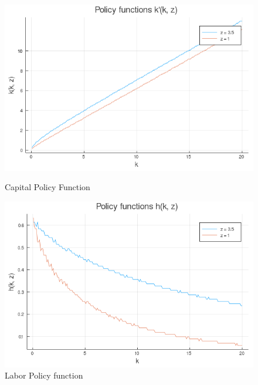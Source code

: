 \documentclass[12pt]{article}
\begin{document}
\begin{figure}[h]
    \centering
    \begin{minipage}{0.45\textwidth}
        \centering
        \includegraphics[width=1.2\textwidth]{cap_policy_1_f.png} %
        \caption{Capital Policy Function}
    \end{minipage}\hfill
    \begin{minipage}{0.45\textwidth}
        \centering
        \includegraphics[width=1.2\textwidth]{lab_policy_1_f.png} %
        \caption{Labor Policy function}
    \end{minipage}
\end{figure}
\end{document}
